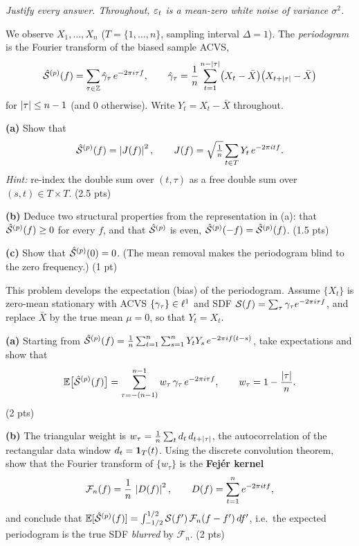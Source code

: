 \documentclass[11pt]{article}
\begin{document}
\pointstable
\begin{center}\itshape Justify every answer. Throughout, $\varepsilon_t$ is a mean-zero white noise of variance $\sigma^2$.\end{center}

We observe $X_1,\dots,X_n$ ($T=\{1,\dots,n\}$, sampling interval $\Delta=1$). The \emph{periodogram} is the Fourier transform of the biased sample ACVS,
\[
\hat{\mathcal{S}}^{(p)}(f)=\sum_{\tau\in\mathbb{Z}}\hat{\gamma}_\tau\,e^{-2\pi i\tau f},
\qquad
\hat{\gamma}_\tau=\frac1n\sum_{t=1}^{n-\left\lvert \tau \right\rvert}\bigl(X_t-\bar X\bigr)\bigl(X_{t+\left\lvert \tau \right\rvert}-\bar X\bigr)
\]
for $\left\lvert \tau \right\rvert\le n-1$ (and $0$ otherwise). Write $Y_t=X_t-\bar X$ throughout.

\textbf{(a)} Show that
\[
\hat{\mathcal{S}}^{(p)}(f)=\left\lvert J(f) \right\rvert^2,\qquad J(f)=\sqrt{\tfrac1n}\sum_{t\in T} Y_t\,e^{-2\pi i t f}.
\]
\emph{Hint:} re-index the double sum over $(t,\tau)$ as a free double sum over $(s,t)\in T\times T$. \hfill(2.5 pts)

\textbf{(b)} Deduce two structural properties from the representation in (a): that $\hat{\mathcal{S}}^{(p)}(f)\ge0$ for every $f$, and that $\hat{\mathcal{S}}^{(p)}$ is even, $\hat{\mathcal{S}}^{(p)}(-f)=\hat{\mathcal{S}}^{(p)}(f)$. \hfill(1.5 pts)

\textbf{(c)} Show that $\hat{\mathcal{S}}^{(p)}(0)=0$. (The mean removal makes the periodogram blind to the zero frequency.) \hfill(1 pt)
\answerpage

This problem develops the expectation (bias) of the periodogram. Assume $\{X_t\}$ is zero-mean stationary with ACVS $\{\gamma_\tau\}\in\ell^1$ and SDF $\mathcal{S}(f)=\sum_\tau\gamma_\tau e^{-2\pi i\tau f}$, and replace $\bar X$ by the true mean $\mu=0$, so that $Y_t=X_t$.

\textbf{(a)} Starting from $\hat{\mathcal{S}}^{(p)}(f)=\frac1n\sum_{t=1}^{n}\sum_{s=1}^{n} Y_tY_s\,e^{-2\pi i f(t-s)}$, take expectations and show that
\[
\mathbb{E}\bigl[\hat{\mathcal{S}}^{(p)}(f)\bigr]=\sum_{\tau=-(n-1)}^{n-1} w_\tau\,\gamma_\tau\,e^{-2\pi i\tau f},
\qquad
w_\tau=1-\frac{\left\lvert \tau \right\rvert}{n}.
\]
\hfill(2 pts)

\textbf{(b)} The triangular weight is $w_\tau=\frac1n\sum_{t} d_t\,d_{t+\left\lvert \tau \right\rvert}$, the autocorrelation of the rectangular data window $d_t=\mathbf{1}_T(t)$. Using the discrete convolution theorem, show that the Fourier transform of $\{w_\tau\}$ is the \textbf{Fej\'er kernel}
\[
\mathcal F_n(f)=\frac1n\,\left\lvert D(f) \right\rvert^2,\qquad D(f)=\sum_{t=1}^{n} e^{-2\pi i t f},
\]
and conclude that $\mathbb{E}[\hat{\mathcal{S}}^{(p)}(f)]=\int_{-1/2}^{1/2}\mathcal{S}(f')\,\mathcal F_n(f-f')\,df'$, i.e.\ the expected periodogram is the true SDF \emph{blurred} by $\mathcal F_n$. \hfill(2 pts)
\end{document}
